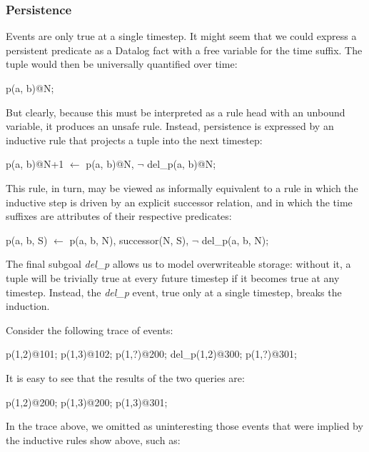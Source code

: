 \subsubsection{Persistence}

Events are only true at a single timestep.  It might seem that we could express a persistent predicate as a Datalog fact with a free variable 
for the time suffix.  The tuple would then be universally quantified over time:

\begin{Dedalus}
p(a, b)@N;
\end{Dedalus}

But clearly, because this must be interpreted as a rule head with an unbound variable, it produces an unsafe rule.  Instead, persistence is
expressed by an inductive rule that projects a tuple into the next timestep:

\begin{Dedalus}
p(a, b)@N+1 \(\leftarrow\)
  p(a, b)@N, 
  \(\lnot\) del\_p(a, b)@N;
\end{Dedalus}

This rule, in turn, may be viewed as informally equivalent to a rule in which the inductive step is driven by an 
explicit successor relation, and in which the time suffixes are attributes of their respective predicates:

\begin{Dedalus}
p(a, b, S) \(\leftarrow\)
  p(a, b, N),
  successor(N, S), 
  \(\lnot\) del\_p(a, b, N);
\end{Dedalus}

The final subgoal \emph{del\_p} allows us to model overwriteable storage: without it, a tuple will be trivially true at every future timestep if it becomes true
at any timestep.  Instead, the \emph{del\_p} event, true only at a single timestep, breaks the induction.

Consider the following trace of events:

\begin{Dedalus}
p(1,2)@101;
p(1,3)@102;
p(1,?)@200;
del_p(1,2)@300;
p(1,?)@301;
\end{Dedalus}

It is easy to see that the results of the two queries are:


\begin{Dedalus}
p(1,2)@200;
p(1,3)@200;
p(1,3)@301;
\end{Dedalus}

In the trace above, we omitted as uninteresting those events that were implied by the 
inductive rules show above, such as:

